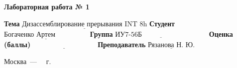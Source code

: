 \begin{titlepage}
\begin{center}
	
	\Large\textbf{Лабораторная работа № 1}\newline
\end{center}

\noindent\textbf{Тема} $\underline{\text{Дизассемблирование прерывания INT 8h}}$\newline\newline\newline
\noindent\textbf{Студент} $\underline{\text{Богаченко Артем~~~~~~~~~~~~~~}}$\newline\newline
\noindent\textbf{Группа} $\underline{\text{ИУ7-56Б~~~~~~~~~~~~~~~~~~~~~~~~~~~~}}$\newline\newline
\noindent\textbf{Оценка (баллы)} $\underline{\text{~~~~~~~~~~~~~~~~~~~~~~~~~~~}}$\newline\newline
\noindent\textbf{Преподаватель} $\underline{\text{Рязанова Н. Ю.}}$\newline
	
\begin{center}
	\vfill
	Москва~---~\the\year
~г.
\end{center}
\end{titlepage}
